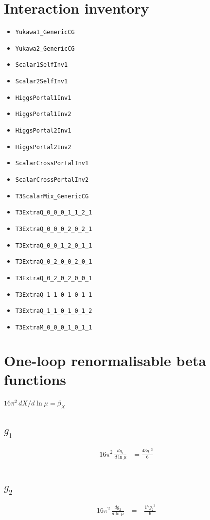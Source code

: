 \documentclass[10pt,a4paper]{article}
\begin{document}
\section*{Interaction inventory}
\begin{itemize}
\item \texttt{Yukawa1\_GenericCG}
\item \texttt{Yukawa2\_GenericCG}
\item \texttt{Scalar1SelfInv1}
\item \texttt{Scalar2SelfInv1}
\item \texttt{HiggsPortal1Inv1}
\item \texttt{HiggsPortal1Inv2}
\item \texttt{HiggsPortal2Inv1}
\item \texttt{HiggsPortal2Inv2}
\item \texttt{ScalarCrossPortalInv1}
\item \texttt{ScalarCrossPortalInv2}
\item \texttt{T3ScalarMix\_GenericCG}
\item \texttt{T3ExtraQ\_0\_0\_0\_1\_1\_2\_1}
\item \texttt{T3ExtraQ\_0\_0\_0\_2\_0\_2\_1}
\item \texttt{T3ExtraQ\_0\_0\_1\_2\_0\_1\_1}
\item \texttt{T3ExtraQ\_0\_2\_0\_0\_2\_0\_1}
\item \texttt{T3ExtraQ\_0\_2\_0\_2\_0\_0\_1}
\item \texttt{T3ExtraQ\_1\_1\_0\_1\_0\_1\_1}
\item \texttt{T3ExtraQ\_1\_1\_0\_1\_0\_1\_2}
\item \texttt{T3ExtraM\_0\_0\_0\_1\_0\_1\_1}
\end{itemize}
\clearpage
\section*{One-loop renormalisable beta functions}
$16\pi^2\,dX/d\ln\mu=\beta_X$
\subsection*{$g_1$}
\begin{align*}
16\pi^2\,\frac{d g_1}{d\ln\mu} &=\frac{43 {g_1}^3}{6} \\
\end{align*}
\subsection*{$g_2$}
\begin{align*}
16\pi^2\,\frac{d g_2}{d\ln\mu} &=-\frac{17 {g_2}^3}{6} \\
\end{align*}
\end{document}
